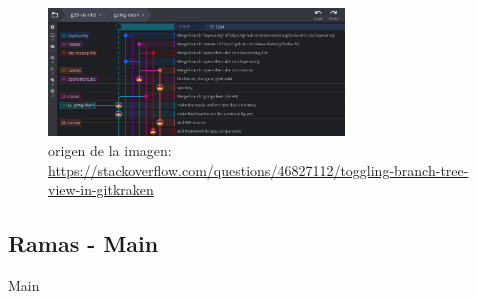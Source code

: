 \documentclass{beamer}
\begin{document}
\begin{frame}
    \begin{figure}[H]
        \includegraphics[width=0.7\textwidth]{Images/ejemplo-ramas.png}
        \caption{origen de la imagen: \url{https://stackoverflow.com/questions/46827112/toggling-branch-tree-view-in-gitkraken}}
    \end{figure}
\end{frame}
\subsection{Ramas - Main}
\begin{frame}{Main}

    

\end{frame}
\end{document}
